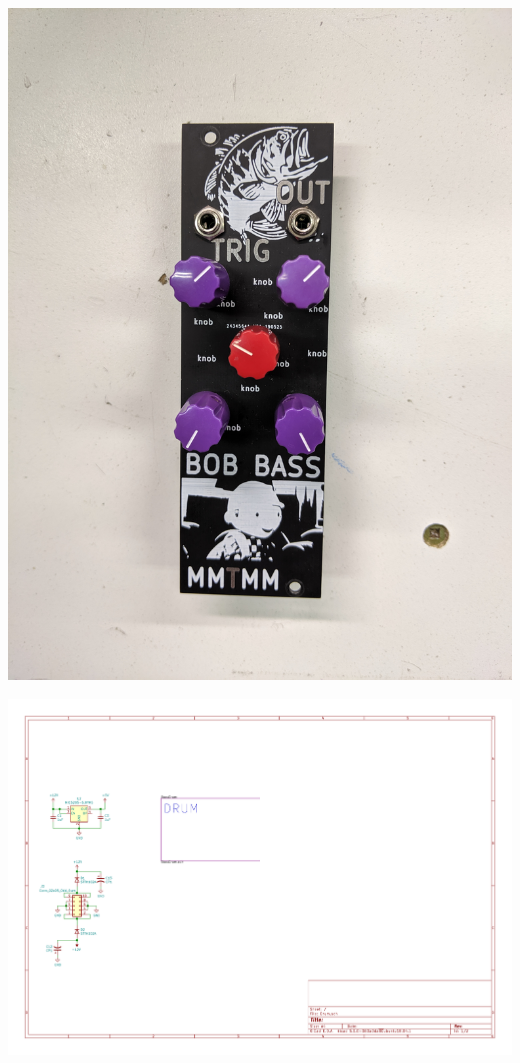 \documentclass[9pt]{developercv} %
\begin{document}
\begin{center}
\includegraphics[scale=0.12,angle=-90,trim={20cm 30cm 15cm 30cm},clip]{../images/IMG_20190725_210209.jpg}
\end{center}

\begin{center}
\includegraphics[page=1,scale=0.6]{../Drum/plot/Drum.pdf}
\end{center}
\end{document}
